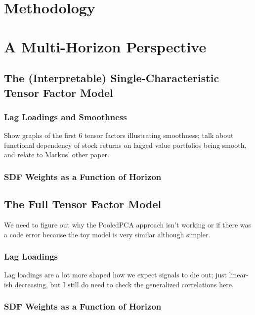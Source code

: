 \documentclass[12pt,letterpaper,fleqn]{article}
\begin{document}
\section{Methodology}

\section{A Multi-Horizon Perspective}

\subsection{The (Interpretable) Single-Characteristic Tensor Factor Model}

\subsubsection{Lag Loadings and Smoothness}

Show graphs of the first 6 tensor factors illustrating smoothness; talk about functional
dependency of stock returns on lagged value portfolios being smooth, and relate 
to Markus' other paper.

\subsubsection{SDF Weights as a Function of Horizon}


\subsection{The Full Tensor Factor Model}

We need to figure out why the PooledPCA approach isn't working or if there was a code 
error because the toy model is very similar although simpler.

\subsubsection{Lag Loadings}

Lag loadings are a lot more shaped how we expect signals to die out; just linear-ish decreasing,
but I still do need to check the generalized correlations here. 

\subsubsection{SDF Weights as a Function of Horizon}


\citep{complexity}
\end{document}
